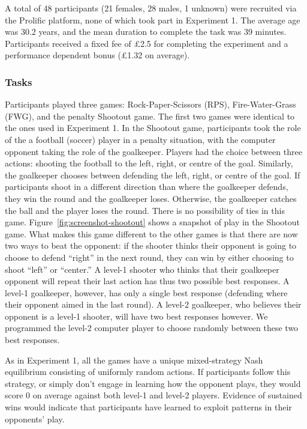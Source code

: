 \documentclass[
  english,
  man,floatsintext]{apa6}
\begin{document}
A total of 48 participants (21 females, 28 males, 1 unknown) were recruited via the Prolific platform, none of which took part in Experiment 1. The average age was 30.2 years, and the mean duration to complete the task was 39 minutes. Participants received a fixed fee of £2.5 for completing the experiment and a performance dependent bonus (£1.32 on average).

\hypertarget{tasks-1}{%
\subsubsection{Tasks}\label{tasks-1}}

Participants played three games: Rock-Paper-Scissors (RPS), Fire-Water-Grass (FWG), and the penalty Shootout game. The first two games were identical to the ones used in Experiment 1. In the Shootout game, participants took the role of the a football (soccer) player in a penalty situation, with the computer opponent taking the role of the goalkeeper. Players had the choice between three actions: shooting the football to the left, right, or centre of the goal. Similarly, the goalkeeper chooses between defending the left, right, or centre of the goal. If participants shoot in a different direction than where the goalkeeper defends, they win the round and the goalkeeper loses. Otherwise, the goalkeeper catches the ball and the player loses the round. There is no possibility of ties in this game. Figure~\ref{fig:screenshot-shootout} shows a snapshot of play in the Shootout game. What makes this game different to the other games is that there are now two ways to beat the opponent: if the shooter thinks their opponent is going to choose to defend ``right'' in the next round, they can win by either choosing to shoot ``left'' or ``center.'' A level-1 shooter who thinks that their goalkeeper opponent will repeat their last action has thus two possible best responses. A level-1 goalkeeper, however, has only a single best response (defending where their opponent aimed in the last round). A level-2 goalkeeper, who believes their opponent is a level-1 shooter, will have two best responses however. We programmed the level-2 computer player to choose randomly between these two best responses.

As in Experiment 1, all the games have a unique mixed-strategy Nash equilibrium consisting of uniformly random actions. If participants follow this strategy, or simply don't engage in learning how the opponent plays, they would score 0 on average against both level-1 and level-2 players. Evidence of sustained wins would indicate that participants have learned to exploit patterns in their opponents' play.
\end{document}
